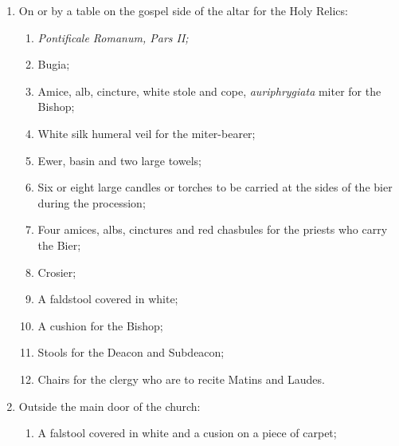 \documentclass[letterpaper]{report}
\begin{document}
{\begin{enumerate}[label=\Roman*.]
        \item On or by a table on the gospel side of the altar for the Holy
            Relics:

            \begin{enumerate}[label=\arabic*.]

                \item \textit{Pontificale Romanum, Pars II;}

                \item Bugia;

                \item Amice, alb, cincture, white stole and cope,
                    \textit{auriphrygiata} miter for the Bishop;

                \item White silk humeral veil for the miter-bearer;

                \item Ewer, basin and two large towels;

                \item Six or eight large candles or torches to be carried at
                    the sides of the bier during the procession;

                \item Four amices, albs, cinctures and red chasbules for the
                    priests who carry the Bier;

                \item Crosier;

                \item A faldstool covered in white;

                \item A cushion for the Bishop;

                \item Stools for the Deacon and Subdeacon;

                \item Chairs for the clergy who are to recite Matins and
                    Laudes.

            \end{enumerate}

        \item Outside the main door of the church:

            \begin{enumerate}[label=\arabic*.]
                
                \item A falstool covered in white and a cusion on a piece of
                    carpet;


\end{enumerate}
\end{enumerate}}
\end{document}
